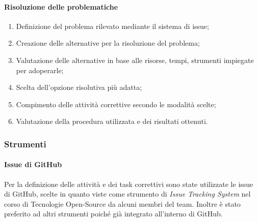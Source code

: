 \paragraph{Risoluzione delle problematiche}
\begin{enumerate}
	\item Definizione del problema rilevato mediante il sistema di issue;
	\item Creazione delle alternative per la risoluzione del problema;
	\item Valutazione delle alternative in base alle risorse, tempi, strumenti impiegate per adoperarle;
	\item Scelta dell'opzione risolutiva più adatta;
	\item Compimento delle attività correttive secondo le modalità scelte;
	\item Valutazione della procedura utilizzata e dei risultati ottenuti.
\end{enumerate}

\subsubsection{Strumenti}
\paragraph{Issue di GitHub}
Per la definizione delle attività e dei task correttivi sono state utilizzate le issue di GitHub, scelte in quanto viste come strumento di \textit{Issue Tracking System\glo} nel corso di Tecnologie Open-Source da alcuni membri del team. Inoltre è stato preferito ad altri strumenti poiché già integrato all'interno di GitHub.
